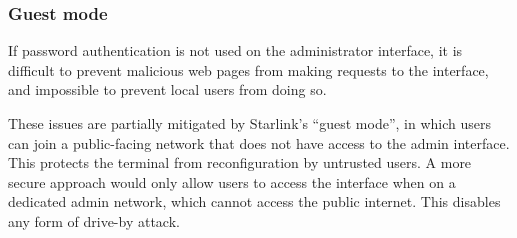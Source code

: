 \subsubsection{Guest mode}

If password authentication is not used on the administrator interface, it is difficult to prevent malicious web pages from making requests to the interface, and impossible to prevent local users from doing so.

These issues are partially mitigated by Starlink's ``guest mode'', in which users can join a public-facing network that does not have access to the admin interface.
This protects the terminal from reconfiguration by untrusted users.
A more secure approach would only allow users to access the interface when on a dedicated admin network, which cannot access the public internet.
This disables any form of drive-by attack.

\begin{comment}
  Edd's notes:

Related work:

Zoom exploit, hitting services running on the local network

https://developer.mozilla.org/en-US/docs/Web/Security/Same-origin_policy
"Cross-origin writes are typically allowed"

https://bugzilla.mozilla.org/show_bug.cgi?id=629094
https://www.grepular.com/Abusing_HTTP_Status_Codes_to_Expose_Private_Information
HTTP status code abuse to extract information cross-origin

https://bugzilla.mozilla.org/show_bug.cgi?id=354493
Zoom videoconferencing problem

https://bugzilla.mozilla.org/show_bug.cgi?id=371598
Drive-by pharming through browsers


Security constraints:

Defeating drive-by javascript:
unencrypted passwords prevents silent drive-by javascript, potentially
websites can still brute force or phish the password from you
some sort of CSRF token from http://my.starlink.com?

Defeating spoofing http://my.starlink.com:
Vulnerable: because it's using plaintext http
Reason: you can't make a request to an insecure origin from a secure origin (need citation)
use https
passwords prevent silently changing the dish

Attackers on local network:

HSTS could be used with TLS to secure this
CSRF tokens

%


\end{comment}
